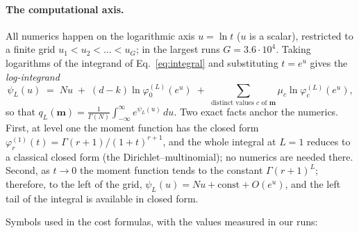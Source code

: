 \documentclass[11pt]{article}
\newcommand{\prof}{\mathbf{m}}
\newcommand{\field}[1]{\paragraph{#1.}}
\begin{document}
\field{The computational axis}
All numerics happen on the logarithmic axis $u = \ln t$ ($u$ is a
scalar), restricted to a finite grid $u_1 < u_2 < \dots < u_G$; in
the largest runs $G = 3.6 \cdot 10^4$.  Taking logarithms of the
integrand of Eq.~\eqref{eq:integral} and substituting $t = e^u$
gives the \emph{log-integrand}
\begin{equation}
  \psi_L(u) \;=\; N u \;+\; (d - k) \ln \varphi^{(L)}_0(e^u)
  \;+\; \sum_{\text{distinct values } c \text{ of } \prof}
  \mu_c \ln \varphi^{(L)}_c(e^u),
  \label{eq:psi}
\end{equation}
so that $q_L(\prof) = \frac{1}{\Gamma(N)} \int_{-\infty}^{\infty}
e^{\psi_L(u)}\, du$.  Two exact facts anchor the numerics.  First,
at level one the moment function has the closed form
$\varphi^{(1)}_r(t) = \Gamma(r+1) / (1+t)^{r+1}$, and the whole
integral at $L = 1$ reduces to a classical closed form (the
Dirichlet--multinomial); no numerics are needed there.  Second, as
$t \to 0$ the moment function tends to the constant
$\Gamma(r+1)^L$; therefore, to the left of the grid, $\psi_L(u) =
Nu + \text{const} + O(e^u)$, and the left tail of the integral is
available in closed form.

\bigskip
\noindent
Symbols used in the cost formulas, with the values measured in our
runs:
\end{document}
